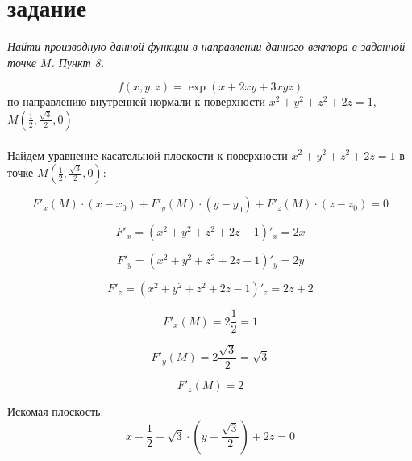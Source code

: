 \documentclass[a5paper, 10pt]{article}
\theoremstyle{definition}
\theoremstyle{plain}
\theoremstyle{remark}
\begin{document}
\section{задание}
\textit{Найти производную данной функции в направлении данного вектора в заданной точке $M$. Пункт 8.}

\begin{equation}
f(x, y, z) = \exp(x + 2xy + 3xyz)
\end{equation}
по направлению внутренней нормали к поверхности $x^2 + y^2 + z^2 + 2z = 1$, $M \left( \frac{1}{2}, \frac{\sqrt{3}}{2}, 0 \right)$\\
\\
Найдем уравнение касательной плоскости к поверхности $x^2 + y^2 + z^2 + 2z = 1$ в точке $M \left( \frac{1}{2}, \frac{\sqrt{3}}{2}, 0 \right)$:

\begin{equation}
F'_x \left( M \right) \cdot (x - x_0) + F'_y \left( M \right) \cdot (y - y_0) + F'_z \left( M \right) \cdot (z - z_0) = 0
\end{equation}

\begin{equation}
F'_x = \left(  x^2 + y^2 + z^2 + 2z - 1 \right)'_x = 2x
\end{equation}

\begin{equation}
F'_y = \left(  x^2 + y^2 + z^2 + 2z - 1 \right)'_y = 2y
\end{equation}

\begin{equation}
F'_z = \left(  x^2 + y^2 + z^2 + 2z - 1 \right)'_z = 2z + 2
\end{equation}

\begin{equation}
F'_x  \left( M \right) = 2 \frac{1}{2} = 1
\end{equation}

\begin{equation}
F'_y  \left( M \right) = 2 \frac{\sqrt{3}}{2} = \sqrt{3}
\end{equation}

\begin{equation}
F'_z  \left( M \right) = 2
\end{equation}

Искомая плоскость:
\begin{equation}
x - \frac{1}{2}  +  \sqrt{3} \cdot (y - \frac{\sqrt{3}}{2}) + 2z= 0
\end{equation}
\end{document}
